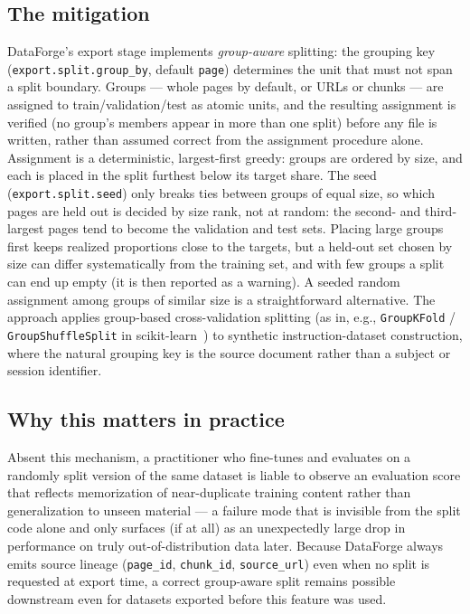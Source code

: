 \documentclass[11pt]{article}
\begin{document}
\subsection{The mitigation}
DataForge's export stage implements \emph{group-aware} splitting: the
grouping key (\texttt{export.split.group\_by}, default \texttt{page})
determines the unit that must not span a split boundary. Groups ---
whole pages by default, or URLs or chunks --- are assigned to
train/validation/test as atomic units, and the resulting assignment is
verified (no group's members appear in more than one split) before any
file is written, rather than assumed correct from the assignment
procedure alone. Assignment is a deterministic, largest-first greedy:
groups are ordered by size, and each is placed in the split furthest
below its target share. The seed (\texttt{export.split.seed}) only
breaks ties between groups of equal size, so which pages are held out is
decided by size rank, not at random: the second- and third-largest pages
tend to become the validation and test sets. Placing large groups first
keeps realized proportions close to the targets, but a held-out set
chosen by size can differ systematically from the training set, and with
few groups a split can end up empty (it is then reported as a warning).
A seeded random assignment among groups of similar size is a
straightforward alternative. The approach applies group-based
cross-validation splitting (as in, e.g., \texttt{GroupKFold} /
\texttt{GroupShuffleSplit} in scikit-learn~\cite{pedregosa2011scikit}) to
synthetic instruction-dataset construction, where the natural grouping
key is the source document rather than a subject or session identifier.

\subsection{Why this matters in practice}
Absent this mechanism, a practitioner who fine-tunes and evaluates on a
randomly split version of the same dataset is liable to observe an
evaluation score that reflects memorization of near-duplicate training
content rather than generalization to unseen material --- a failure
mode that is invisible from the split code alone and only surfaces (if
at all) as an unexpectedly large drop in performance on truly
out-of-distribution data later. Because DataForge always emits source
lineage (\texttt{page\_id}, \texttt{chunk\_id}, \texttt{source\_url})
even when no split is requested at export time, a correct group-aware
split remains possible downstream even for datasets exported before
this feature was used.
\end{document}
